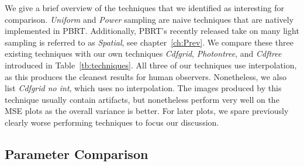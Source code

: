 We give a brief overview of the techniques that we identified as interesting for comparison. \textit{Uniform} and \textit{Power} sampling are naive techniques that are natively implemented in PBRT. Additionally, PBRT's recently released take on many light sampling is referred to as \textit{Spatial}, see chapter~\ref{ch:Prev}. We compare these three existing techniques with our own techniques \textit{Cdfgrid}, \textit{Photontree}, and \textit{Cdftree} introduced in Table~\ref{tb:techniques}. All three of our techniques use interpolation, as this produces the cleanest results for human observers. Nonetheless, we also list \textit{Cdfgrid no int}, which uses no interpolation. The images produced by this technique usually contain artifacts, but nonetheless perform very well on the MSE plots as the overall variance is better. For later plots, we spare previously clearly worse performing techniques to focus our discussion.

\subsection{Parameter Comparison}

